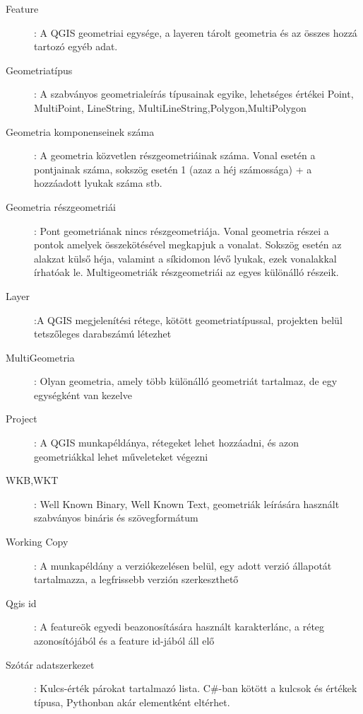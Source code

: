 \begin{description}
	\item[Feature]: A QGIS geometriai egysége, a layeren tárolt geometria és az összes hozzá tartozó egyéb adat.

	\item[Geometriatípus]: A szabványos geometrialeírás típusainak egyike, lehetséges értékei Point, MultiPoint, LineString, MultiLineString,Polygon,MultiPolygon

	\item[Geometria komponenseinek száma]: A geometria közvetlen részgeometriáinak száma. Vonal esetén a pontjainak száma, sokszög esetén 1 (azaz a héj számossága) + a hozzáadott lyukak száma stb.

	\item[Geometria részgeometriái]: Pont geometriának nincs részgeometriája. Vonal geometria részei a pontok amelyek összekötésével megkapjuk a vonalat. Sokszög esetén az alakzat külső héja, valamint a síkidomon lévő lyukak, ezek vonalakkal írhatóak le. Multigeometriák részgeometriái az egyes különálló részeik.

	\item[Layer]:A QGIS megjelenítési rétege, kötött geometriatípussal, projekten belül tetszőleges darabszámú létezhet

	\item[MultiGeometria]: Olyan geometria, amely több különálló geometriát tartalmaz, de egy egységként van kezelve

	\item[Project]: A QGIS munkapéldánya, rétegeket lehet hozzáadni, és azon geometriákkal lehet műveleteket végezni

	\item[WKB,WKT]: Well Known Binary, Well Known Text, geometriák leírására használt szabványos bináris és szövegformátum

	\item[Working Copy]: A munkapéldány a verziókezelésen belül, egy adott verzió állapotát tartalmazza, a legfrissebb verzión szerkeszthető

	\item[Qgis id]: A featureök egyedi beazonosítására használt karakterlánc, a réteg azonosítójából és a feature id-jából áll elő

	\item[Szótár adatszerkezet]: Kulcs-érték párokat tartalmazó lista. C\#-ban kötött a kulcsok és értékek típusa, Pythonban akár elementként eltérhet.
\end{description}